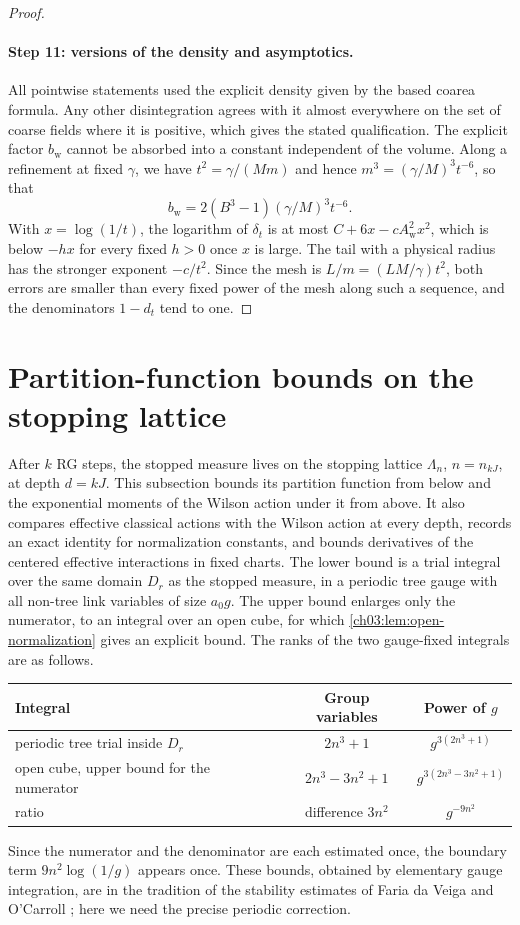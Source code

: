 \begin{proof}
\paragraph{Step 11: versions of the density and asymptotics.}
All pointwise statements used the explicit density given by the based coarea formula. Any other disintegration agrees with it almost everywhere on the set of coarse fields where it is positive, which gives the stated qualification. The explicit factor $b_{\mathrm w}$ cannot be absorbed into a constant independent of the volume. Along a refinement at fixed $\gamma$, we have $t^2=\gamma/(Mm)$ and hence $m^3=(\gamma/M)^3t^{-6}$, so that
\[
 b_{\mathrm w}=2(B^3-1)(\gamma/M)^3t^{-6}.
\]
With $x=\log(1/t)$, the logarithm of $\delta_t$ is at most $C+6x-cA_{\mathrm w}^2x^2$, which is below $-hx$ for every fixed $h>0$ once $x$ is large. The tail with a physical radius has the stronger exponent $-c/t^2$. Since the mesh is $L/m=(LM/\gamma)t^2$, both errors are smaller than every fixed power of the mesh along such a sequence, and the denominators $1-d_t$ tend to one.
\end{proof}

\section{Partition-function bounds on the stopping lattice}\label{ch11:sec:partition}

After $k$ RG steps, the stopped measure lives on the stopping lattice $\Lambda_n$, $n=n_{kJ}$, at depth $d=kJ$. This subsection bounds its partition function from below and the exponential moments of the Wilson action under it from above. It also compares effective classical actions with the Wilson action at every depth, records an exact identity for normalization constants, and bounds derivatives of the centered effective interactions in fixed charts. The lower bound is a trial integral over the same domain $D_r$ as the stopped measure, in a periodic tree gauge with all non-tree link variables of size $a_0g$. The upper bound enlarges only the numerator, to an integral over an open cube, for which \cref{ch03:lem:open-normalization} gives an explicit bound. The ranks of the two gauge-fixed integrals are as follows.
\begin{center}
\begin{tabular}{p{}cc}
\toprule
Integral & Group variables & Power of $g$ \\
\midrule
periodic tree trial inside $D_r$ & $2n^3+1$ & $g^{3(2n^3+1)}$ \\
open cube, upper bound for the numerator & $2n^3-3n^2+1$ & $g^{3(2n^3-3n^2+1)}$ \\
ratio & difference $3n^2$ & $g^{-9n^2}$ \\
\bottomrule
\end{tabular}
\end{center}
Since the numerator and the denominator are each estimated once, the boundary term $9n^2\log(1/g)$ appears once. These bounds, obtained by elementary gauge integration, are in the tradition of the stability estimates of Faria da Veiga and O'Carroll \cite{FariaVeigaOCarroll2019,FariaVeigaOCarroll2025}; here we need the precise periodic correction.

